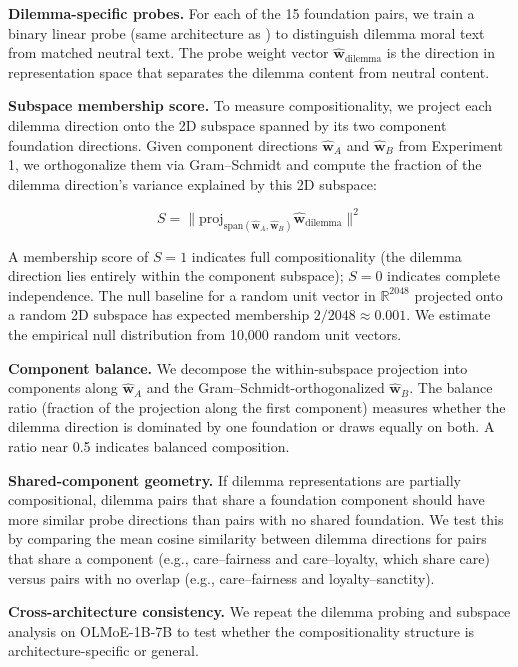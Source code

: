 \textbf{Dilemma-specific probes.} For each of the 15 foundation pairs,
we train a binary linear probe (same architecture as ) to
distinguish dilemma moral text from matched neutral text. The
probe weight vector \(\hat{\mathbf{w}}_{\text{dilemma}}\) is the
direction in representation space that separates the dilemma
content from neutral content.

\textbf{Subspace membership score.} To measure compositionality, we
project each dilemma direction onto the 2D subspace spanned by its
two component foundation directions. Given component directions
\(\hat{\mathbf{w}}_A\) and \(\hat{\mathbf{w}}_B\) from Experiment 1,
we orthogonalize them via Gram--Schmidt and compute the fraction
of the dilemma direction's variance explained by this 2D subspace:

\[S = \|\text{proj}_{\text{span}(\hat{\mathbf{w}}_A, \hat{\mathbf{w}}_B)} \hat{\mathbf{w}}_{\text{dilemma}}\|^2\]

A membership score of \(S = 1\) indicates full compositionality
(the dilemma direction lies entirely within the component
subspace); \(S = 0\) indicates complete independence. The null
baseline for a random unit vector in \(\mathbb{R}^{2048}\) projected
onto a random 2D subspace has expected membership \(2/2048 \approx
0.001\). We estimate the empirical null distribution from 10,000
random unit vectors.

\textbf{Component balance.} We decompose the within-subspace projection
into components along \(\hat{\mathbf{w}}_A\) and the
Gram--Schmidt-orthogonalized \(\hat{\mathbf{w}}_B\). The balance
ratio (fraction of the projection along the first component)
measures whether the dilemma direction is dominated by one
foundation or draws equally on both. A ratio near 0.5 indicates
balanced composition.

\textbf{Shared-component geometry.} If dilemma representations are
partially compositional, dilemma pairs that share a foundation
component should have more similar probe directions than pairs
with no shared foundation. We test this by comparing the mean
cosine similarity between dilemma directions for pairs that share
a component (e.g., care--fairness and care--loyalty, which share
care) versus pairs with no overlap (e.g., care--fairness and
loyalty--sanctity).

\textbf{Cross-architecture consistency.} We repeat the dilemma probing
and subspace analysis on OLMoE-1B-7B to test whether the
compositionality structure is architecture-specific or general.
